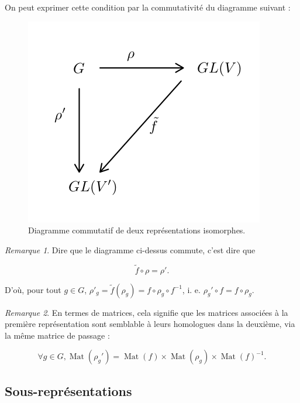 \documentclass[french]{book}
\theoremstyle{definition}
\theoremstyle{remark}
\newtheorem*{remark}{Remarque}
\begin{document}
On peut exprimer cette condition par la commutativité du diagramme suivant :

\begin{figure}[h!]
  \centering
  \includegraphics[scale=0.3]{figures/rep-iso.png}
  \caption{Diagramme commutatif de deux représentations isomorphes.}
  \label{}
\end{figure}

\begin{remark}
  Dire que le diagramme ci-dessus commute, c'est dire que

  \[\tilde{f} \circ \rho = \rho'.\]

  D'où, pour tout \(g \in G\), \(\rho'_g = \tilde{f} (\rho_g) = f \circ \rho_g \circ f ^{-1} \), i. e. \( \rho_g' \circ f = f \circ \rho_g\).
\end{remark}

\begin{remark}
  En termes de matrices, cela signifie  que les matrices associées à la première représentation sont semblable à leurs homologues dans la deuxième, via la même matrice de passage :

  \[\forall g \in G, \operatorname{Mat}(\rho_g') = \operatorname{Mat}(f) \times \operatorname{Mat}(\rho_g) \times \operatorname{Mat}(f) ^{-1}. \]
\end{remark}

\subsection{Sous-représentations}
\end{document}
